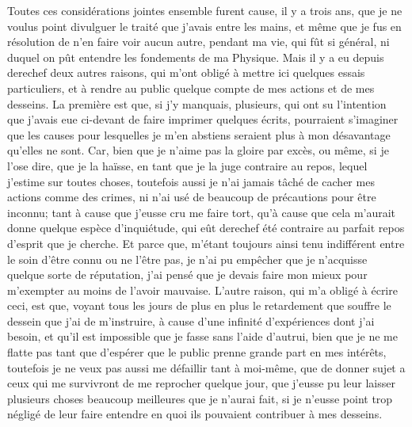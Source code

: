 \documentclass[french,twoside]{book} %
\begin{document}
Toutes ces considérations jointes ensemble furent cause, il y a trois ans, que je ne voulus point divulguer le traité que j'avais entre les mains, et même que je fus en résolution de n'en faire voir aucun autre, pendant ma vie, qui fût si général, ni duquel on pût entendre les fondements de ma Physique. Mais il y a eu depuis derechef deux autres raisons, qui m'ont obligé à mettre ici quelques essais particuliers, et à rendre au public quelque compte de mes actions et de mes desseins. La première est que, si j'y manquais, plusieurs, qui ont su l'intention que j'avais eue ci-devant de faire imprimer quelques écrits, pourraient s'imaginer que les causes pour lesquelles je m'en abstiens seraient plus à mon désavantage qu'elles ne sont. Car, bien que je n'aime pas la gloire par excès, ou même, si je l'ose dire, que je la haïsse, en tant que je la juge contraire au repos, lequel j'estime sur toutes choses, toutefois aussi je n'ai jamais tâché de cacher mes actions comme des crimes, ni n'ai usé de beaucoup de précautions pour être inconnu; tant à cause que j'eusse cru me faire tort, qu'à cause que cela m'aurait donne quelque espèce d'inquiétude, qui eût derechef été contraire au parfait repos d'esprit que je cherche. Et parce que, m'étant toujours ainsi tenu indifférent entre le soin d'être connu ou ne l'être pas, je n'ai pu empêcher que je n'acquisse quelque sorte de réputation, j'ai pensé que je devais faire mon mieux pour m'exempter au moins de l'avoir mauvaise. L'autre raison, qui m'a obligé à écrire ceci, est que, voyant tous les jours de plus en plus le retardement que souffre le dessein que j'ai de m'instruire, à cause d'une infinité d'expériences dont j'ai besoin, et qu'il est impossible que je fasse sans l'aide d'autrui, bien que je ne me flatte pas tant que d'espérer que le public prenne grande part en mes intérêts, toutefois je ne veux pas aussi me défaillir tant à moi-même, que de donner sujet a ceux qui me survivront de me reprocher quelque jour, que j'eusse pu leur laisser plusieurs choses beaucoup meilleures que je n'aurai fait, si je n'eusse point trop négligé de leur faire entendre en quoi ils pouvaient contribuer à mes desseins.\par
\end{document}
